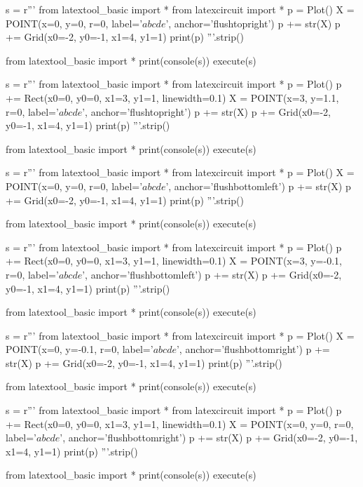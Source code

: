 \newpage
\begin{python}
s = r'''
from latextool_basic import *
from latexcircuit import *
p = Plot()
X = POINT(x=0, y=0, r=0, label='$abcde$', anchor='flushtopright')
p += str(X)
p += Grid(x0=-2, y0=-1, x1=4, y1=1)
print(p)
'''.strip()

from latextool_basic import *
print(console(s))
execute(s)
\end{python}

\begin{python}
s = r'''
from latextool_basic import *
from latexcircuit import *
p = Plot()
p += Rect(x0=0, y0=0, x1=3, y1=1, linewidth=0.1)
X = POINT(x=3, y=1.1, r=0, label='$abcde$', anchor='flushtopright')
p += str(X)
p += Grid(x0=-2, y0=-1, x1=4, y1=1)
print(p)
'''.strip()

from latextool_basic import *
print(console(s))
execute(s)
\end{python}


\newpage
\begin{python}
s = r'''
from latextool_basic import *
from latexcircuit import *
p = Plot()
X = POINT(x=0, y=0, r=0, label='$abcde$', anchor='flushbottomleft')
p += str(X)
p += Grid(x0=-2, y0=-1, x1=4, y1=1)
print(p)
'''.strip()

from latextool_basic import *
print(console(s))
execute(s)
\end{python}

\begin{python}
s = r'''
from latextool_basic import *
from latexcircuit import *
p = Plot()
p += Rect(x0=0, y0=0, x1=3, y1=1, linewidth=0.1)
X = POINT(x=3, y=-0.1, r=0, label='$abcde$', anchor='flushbottomleft')
p += str(X)
p += Grid(x0=-2, y0=-1, x1=4, y1=1)
print(p)
'''.strip()

from latextool_basic import *
print(console(s))
execute(s)
\end{python}



\newpage
\begin{python}
s = r'''
from latextool_basic import *
from latexcircuit import *
p = Plot()
X = POINT(x=0, y=-0.1, r=0, label='$abcde$', anchor='flushbottomright')
p += str(X)
p += Grid(x0=-2, y0=-1, x1=4, y1=1)
print(p)
'''.strip()

from latextool_basic import *
print(console(s))
execute(s)
\end{python}


\begin{python}
s = r'''
from latextool_basic import *
from latexcircuit import *
p = Plot()
p += Rect(x0=0, y0=0, x1=3, y1=1, linewidth=0.1)
X = POINT(x=0, y=0, r=0, label='$abcde$', anchor='flushbottomright')
p += str(X)
p += Grid(x0=-2, y0=-1, x1=4, y1=1)
print(p)
'''.strip()

from latextool_basic import *
print(console(s))
execute(s)
\end{python}


